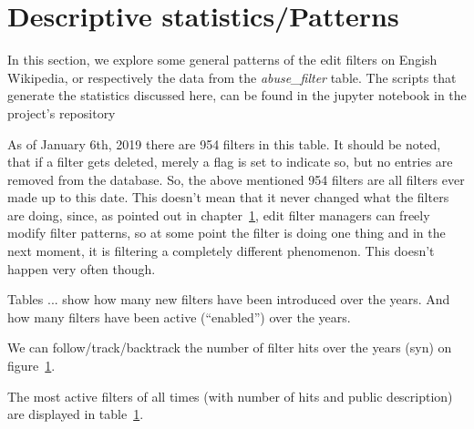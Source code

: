 \section{Descriptive statistics/Patterns}

In this section, we explore some general patterns of the edit filters on Engish Wikipedia, or respectively the data from the \emph{abuse\_filter} table.
The scripts that generate the statistics discussed here, can be found in the jupyter notebook in the project's repository %

As of January 6th, 2019 there are 954 filters in this table.
It should be noted, that if a filter gets deleted, merely a flag is set to indicate so, but no entries are removed from the database.
So, the above mentioned 954 filters are all filters ever made up to this date.
This doesn't mean that it never changed what the filters are doing, since, as pointed out in chapter~\ref{}, edit filter managers can freely modify filter patterns, so at some point the filter is doing one thing and in the next moment, it is filtering a completely different phenomenon.
This doesn't happen very often though.

Tables ... show how many new filters have been introduced over the years.
And how many filters have been active (``enabled'') over the years.

We can follow/track/backtrack the number of filter hits over the years (syn) on figure~\ref{}.
\begin{comment}
    \item has the willingness of the community to use filters increased over time?: looking at aggregated values of number of triggered filters per year, the answer is rather it's quite constant; TODO: plot it at a finer granularity
        when aggregating filter triggers per month, one notices that there's an overall slight upward tendency.
        Also, there is a dip in the middle of 2014 and a notable peak at the beginning of 2016, that should be investigated further.
\end{comment}

The most active filters of all times (with number of hits and public description) are displayed in table~\ref{}.

\begin{comment}
    \item how many currently trigger which action (disallow, warn, throttle, tag, ..)?
    \item how often were filters with different actions triggered? (afl\_actions) (over time) --> abuse\_filter\_log
    \item explore timestamp (I think it means "last modified"): have a lot of filters been modified recently?
    \item categorise filters according to which name spaces they apply to; pay special attention to edits in user/talks name spaces (may be indication of filtering harassment)
\end{comment}


